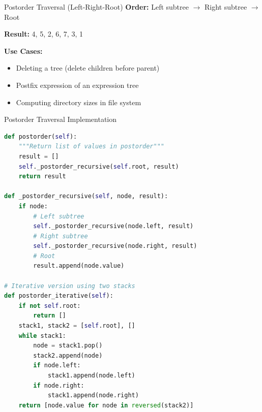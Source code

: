 \documentclass[aspectratio=169]{beamer}
\begin{document}
\begin{frame}{Postorder Traversal (Left-Right-Root)}
  \textbf{Order:} Left subtree $\rightarrow$ Right subtree $\rightarrow$ Root

  \vspace{0.3cm}
  \begin{center}
  \end{center}

  \textbf{Result:} 4, 5, 2, 6, 7, 3, 1

  \vspace{0.3cm}
  \textbf{Use Cases:}
  \begin{itemize}
    \item Deleting a tree (delete children before parent)
    \item Postfix expression of an expression tree
    \item Computing directory sizes in file system
  \end{itemize}
\end{frame}

\begin{frame}[fragile]{Postorder Traversal Implementation}
  \begin{lstlisting}[language=Python, basicstyle=\ttfamily\small]
def postorder(self):
    """Return list of values in postorder"""
    result = []
    self._postorder_recursive(self.root, result)
    return result

def _postorder_recursive(self, node, result):
    if node:
        # Left subtree
        self._postorder_recursive(node.left, result)
        # Right subtree
        self._postorder_recursive(node.right, result)
        # Root
        result.append(node.value)

# Iterative version using two stacks
def postorder_iterative(self):
    if not self.root:
        return []
    stack1, stack2 = [self.root], []
    while stack1:
        node = stack1.pop()
        stack2.append(node)
        if node.left:
            stack1.append(node.left)
        if node.right:
            stack1.append(node.right)
    return [node.value for node in reversed(stack2)]
  \end{lstlisting}
\end{frame}
\end{document}

